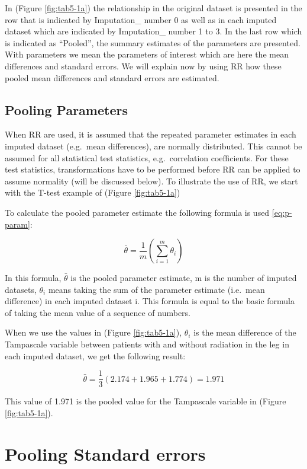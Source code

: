 \documentclass[]{book}
\theoremstyle{definition}
\theoremstyle{definition}
\theoremstyle{definition}
\theoremstyle{remark}
\begin{document}
In (Figure \ref{fig:tab5-1a}) the relationship in the original dataset
is presented in the row that is indicated by Imputation\_ number 0 as
well as in each imputed dataset which are indicated by Imputation\_
number 1 to 3. In the last row which is indicated as ``Pooled'', the
summary estimates of the parameters are presented. With parameters we
mean the parameters of interest which are here the mean differences and
standard errors. We will explain now by using RR how these pooled mean
differences and standard errors are estimated.

\subsection{Pooling Parameters}\label{pooling-parameters}

When RR are used, it is assumed that the repeated parameter estimates in
each imputed dataset (e.g.~mean differences), are normally distributed.
This cannot be assumed for all statistical test statistics,
e.g.~correlation coefficients. For these test statistics,
transformations have to be performed before RR can be applied to assume
normality (will be discussed below). To illustrate the use of RR, we
start with the T-test example of (Figure \ref{fig:tab5-1a})

To calculate the pooled parameter estimate the following formula is used
\eqref{eq:p-param}:

\begin{equation}
  \bar{\theta} = \frac{1}{m}\left (\sum_{i=1}^m{\theta_i}\right )
  \label{eq:p-param}
\end{equation}

In this formula, \(\bar{\theta}\) is the pooled parameter estimate, m is
the number of imputed datasets, \(\theta_i\) means taking the sum of the
parameter estimate (i.e.~mean difference) in each imputed dataset i.
This formula is equal to the basic formula of taking the mean value of a
sequence of numbers.

When we use the values in (Figure \ref{fig:tab5-1a}), \(\theta_i\) is
the mean difference of the Tampascale variable between patients with and
without radiation in the leg in each imputed dataset, we get the
following result:

\[\bar{\theta} = \frac{1}{3}(2.174 + 1.965+1.774)=1.971\]

This value of 1.971 is the pooled value for the Tampascale variable in
(Figure \ref{fig:tab5-1a}).

\section{Pooling Standard errors}\label{pooling-standard-errors}
\end{document}
